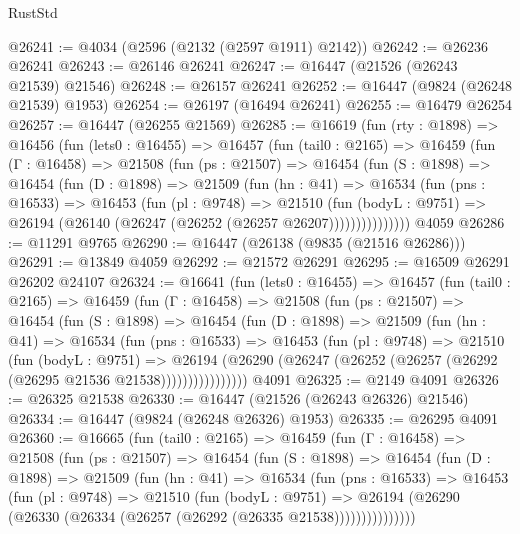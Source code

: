 \begin{lexlean}{RustStd}
\begin{coremodule}
@26241 := @4034 (@2596 (@2132 (@2597 @1911) @2142))
@26242 := @26236 @26241
@26243 := @26146 @26241
@26247 := @16447 (@21526 (@26243 @21539) @21546)
@26248 := @26157 @26241
@26252 := @16447 (@9824 (@26248 @21539) @1953)
@26254 := @26197 (@16494 @26241)
@26255 := @16479 @26254
@26257 := @16447 (@26255 @21569)
@26285 := @16619
    (fun (rty : @1898) =>
    @16456
      (fun (lets0 : @16455) =>
      @16457
        (fun (tail0 : @2165) =>
        @16459
          (fun (Γ : @16458) =>
          @21508
            (fun (ps : @21507) =>
            @16454
              (fun (S : @1898) =>
              @16454
                (fun (D : @1898) =>
                @21509
                  (fun (hn : @41) =>
                  @16534
                    (fun (pns : @16533) =>
                    @16453
                      (fun (pl : @9748) =>
                      @21510
                        (fun (bodyL : @9751) =>
                        @26194 (@26140 (@26247 (@26252 (@26257 @26207)))))))))))))))
    @4059
@26286 := @11291 @9765
@26290 := @16447 (@26138 (@9835 (@21516 @26286)))
@26291 := @13849 @4059
@26292 := @21572 @26291
@26295 := @16509 @26291 @26202 @24107
@26324 := @16641
    (fun (lets0 : @16455) =>
    @16457
      (fun (tail0 : @2165) =>
      @16459
        (fun (Γ : @16458) =>
        @21508
          (fun (ps : @21507) =>
          @16454
            (fun (S : @1898) =>
            @16454
              (fun (D : @1898) =>
              @21509
                (fun (hn : @41) =>
                @16534
                  (fun (pns : @16533) =>
                  @16453
                    (fun (pl : @9748) =>
                    @21510
                      (fun (bodyL : @9751) =>
                      @26194
                        (@26290
                          (@26247 (@26252 (@26257 (@26292 (@26295 @21536 @21538))))))))))))))))
    @4091
@26325 := @2149 @4091
@26326 := @26325 @21538
@26330 := @16447 (@21526 (@26243 @26326) @21546)
@26334 := @16447 (@9824 (@26248 @26326) @1953)
@26335 := @26295 @4091
@26360 := @16665
    (fun (tail0 : @2165) =>
    @16459
      (fun (Γ : @16458) =>
      @21508
        (fun (ps : @21507) =>
        @16454
          (fun (S : @1898) =>
          @16454
            (fun (D : @1898) =>
            @21509
              (fun (hn : @41) =>
              @16534
                (fun (pns : @16533) =>
                @16453
                  (fun (pl : @9748) =>
                  @21510
                    (fun (bodyL : @9751) =>
                    @26194 (@26290 (@26330 (@26334 (@26257 (@26292 (@26335 @21538)))))))))))))))

\end{coremodule}
\end{lexlean}
